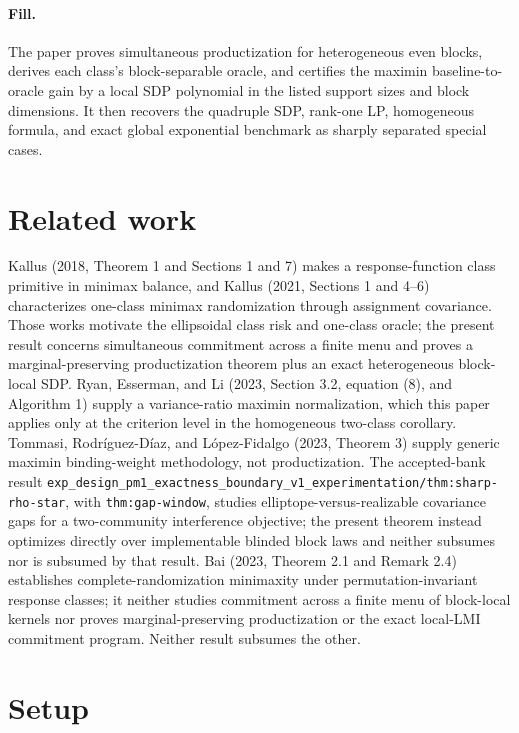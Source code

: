 \documentclass{article}
\begin{document}
\paragraph{Fill.} The paper proves simultaneous productization for heterogeneous even blocks, derives each class's block-separable oracle, and certifies the maximin baseline-to-oracle gain by a local SDP polynomial in the listed support sizes and block dimensions. It then recovers the quadruple SDP, rank-one LP, homogeneous formula, and exact global exponential benchmark as sharply separated special cases.

\section{Related work}

Kallus (2018, Theorem 1 and Sections 1 and 7) makes a response-function class primitive in minimax balance, and Kallus (2021, Sections 1 and 4--6) characterizes one-class minimax randomization through assignment covariance. Those works motivate the ellipsoidal class risk and one-class oracle; the present result concerns simultaneous commitment across a finite menu and proves a marginal-preserving productization theorem plus an exact heterogeneous block-local SDP. Ryan, Esserman, and Li (2023, Section 3.2, equation (8), and Algorithm 1) supply a variance-ratio maximin normalization, which this paper applies only at the criterion level in the homogeneous two-class corollary. Tommasi, Rodr\'iguez-D\'iaz, and L\'opez-Fidalgo (2023, Theorem 3) supply generic maximin binding-weight methodology, not productization. The accepted-bank result \texttt{exp\_design\_pm1\_exactness\_boundary\_v1\_experimentation/thm:sharp-rho-star}, with \texttt{thm:gap-window}, studies elliptope-versus-realizable covariance gaps for a two-community interference objective; the present theorem instead optimizes directly over implementable blinded block laws and neither subsumes nor is subsumed by that result. Bai (2023, Theorem 2.1 and Remark 2.4) establishes complete-randomization minimaxity under permutation-invariant response classes; it neither studies commitment across a finite menu of block-local kernels nor proves marginal-preserving productization or the exact local-LMI commitment program. Neither result subsumes the other.

\section{Setup}
\end{document}
